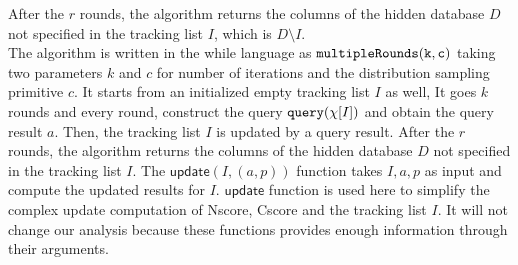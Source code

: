 After the $r$ rounds, the algorithm returns the columns of the hidden database $D$ not specified in the tracking list $I$, which is $D \setminus I$. 
\\
The algorithm is written in the while language as $\mathtt{multipleRounds(k, c)} $ taking two parameters $k$ and $c$ for 
number of iterations and the distribution sampling primitive $c$.
It starts from an initialized empty tracking list $I$ as well,
It goes $k$ rounds and every round, construct the query ${\tt query}(\chi[I])$
and obtain the query result $a$.
Then, the tracking list $I$ is updated by a query result. 
After the $r$ rounds, the algorithm returns the columns of the hidden database $D$ not specified in the tracking list $I$.
The $\mathrel{\mathsf{update}} ( {I}, (a, p))$ function takes $I, a, p$ as input and compute the updated results for $I$.
$\mathsf{update}$ function is used here to simplify the complex update computation of Nscore, Cscore and the tracking list $I$.
It will not change our analysis because these functions provides enough information through their arguments.%

